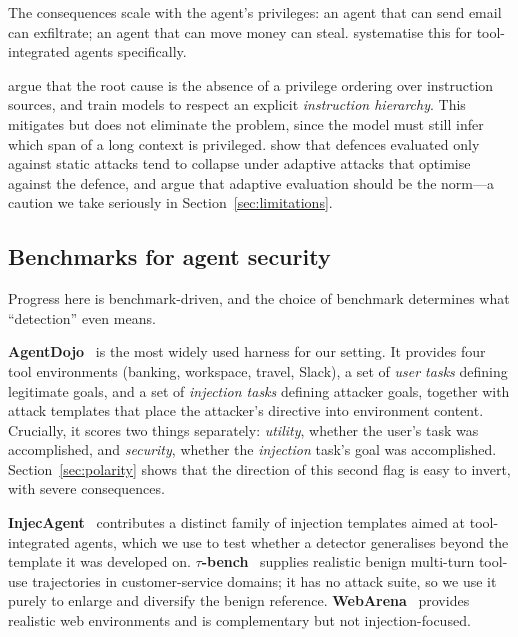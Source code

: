 \documentclass[pdflatex,sn-basic]{sn-jnl}%
\theoremstyle{thmstyleone}
\theoremstyle{thmstyletwo}
\theoremstyle{thmstylethree}
\begin{document}
The consequences scale with the agent's privileges: an agent that can send email
can exfiltrate; an agent that can move money can steal.
\citet{zhan2024injecagent} systematise this for tool-integrated agents
specifically.

\citet{wallace2024instructionhierarchy} argue that the root cause is the absence
of a privilege ordering over instruction sources, and train models to respect an
explicit \emph{instruction hierarchy}. This mitigates but does not eliminate the
problem, since the model must still infer which span of a long context is
privileged. \citet{nasr2025attackersecond} show that defences evaluated only
against static attacks tend to collapse under adaptive attacks that optimise
against the defence, and argue that adaptive evaluation should be the norm---a
caution we take seriously in Section~\ref{sec:limitations}.

\subsection{Benchmarks for agent security}

Progress here is benchmark-driven, and the choice of benchmark determines what
``detection'' even means.

\textbf{AgentDojo}~\citep{debenedetti2024agentdojo} is the most widely used
harness for our setting. It provides four tool environments (banking, workspace,
travel, Slack), a set of \emph{user tasks} defining legitimate goals, and a set of
\emph{injection tasks} defining attacker goals, together with attack templates
that place the attacker's directive into environment content. Crucially, it scores
two things separately: \emph{utility}, whether the user's task was accomplished,
and \emph{security}, whether the \emph{injection} task's goal was accomplished.
Section~\ref{sec:polarity} shows that the direction of this second flag is easy
to invert, with severe consequences.

\textbf{InjecAgent}~\citep{zhan2024injecagent} contributes a distinct family of
injection templates aimed at tool-integrated agents, which we use to test whether
a detector generalises beyond the template it was developed on.
\textbf{$\tau$-bench}~\citep{yao2024taubench} supplies realistic benign
multi-turn tool-use trajectories in customer-service domains; it has no attack
suite, so we use it purely to enlarge and diversify the benign reference.
\textbf{WebArena}~\citep{zhou2023webarena} provides realistic web environments
and is complementary but not injection-focused.
\end{document}
